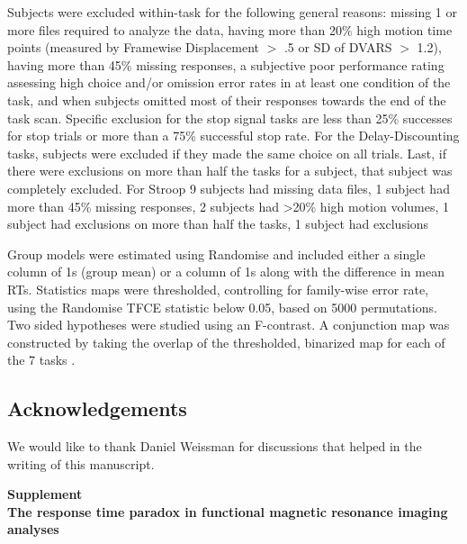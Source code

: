 \documentclass[titlepage,12pt] {article}
\newcommand{\beginsupplement}{%
        \setcounter{table}{0}
        \renewcommand{\thetable}{S\arabic{table}}%
        \setcounter{figure}{0}
        \renewcommand{\thefigure}{S\arabic{figure}}%
     }
\begin{document}
Subjects were excluded within-task for the following general reasons: missing 1 or more files required to analyze the data, having more than 20\% high motion time points (measured by Framewise Displacement $>$ .5 or SD of DVARS $>$ 1.2), having more than 45\% missing responses, a subjective poor performance rating assessing high choice and/or omission error rates in at least one condition of the task, and when subjects omitted most of their responses towards the end of the task scan.  Specific exclusion for the stop signal tasks are less than 25\% successes for stop trials or more than a 75\% successful stop rate.  For the Delay-Discounting tasks, subjects were excluded if they made the same choice on all trials.  Last, if there were exclusions on more than half the tasks for a subject, that subject was completely excluded.  For Stroop 9 subjects had missing data files, 1 subject had more than 45\% missing responses, 2 subjects had >20\% high motion volumes, 1 subject had exclusions on more than half the tasks, 1 subject had exclusions

Group models were estimated using Randomise \citep{smith2009} and included either a single column of 1s (group mean) or a column of 1s along with the difference in mean RTs. Statistics maps were thresholded, controlling for family-wise error rate, using the Randomise TFCE statistic below 0.05, based on 5000 permutations.  Two sided hypotheses were studied using an F-contrast.  A conjunction map was constructed by taking the overlap of the thresholded, binarized map for each of the 7 tasks \citep{nichols_valid_2005}.


\subsection*{Acknowledgements}
We would like to thank Daniel Weissman for discussions that helped in the writing of this manuscript.




\newpage
\beginsupplement

\begin{center}
{\large\textbf{Supplement \\ The response time paradox in functional magnetic resonance imaging analyses
}}
\end{center}
\end{document}

